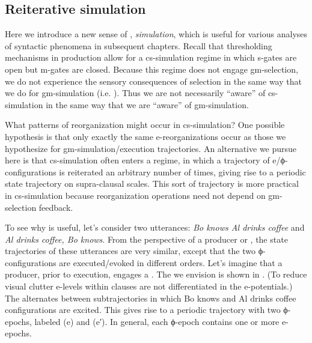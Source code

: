 \subsection{Reiterative simulation}

Here we introduce a new sense of , \textit{ simulation}, which is useful for various analyses of syntactic phenomena in subsequent chapters. Recall that thresholding mechanisms in production allow for a cs-simulation regime in which s-gates are open but m-gates are closed. Because this regime does not engage gm-selection, we do not experience the sensory consequences of selection in the same way that we do for gm-simulation (i.e. ). Thus we are not necessarily “aware” of cs-simulation in the same way that we are “aware” of gm-simulation.

  What patterns of reorganization might occur in cs-simulation? One possible hypothesis is that only exactly the same e-reorganizations occur as those we hypothesize for gm-simulation/execution trajectories. An alternative we pursue here is that cs-simulation often enters a  regime, in which a trajectory of e/ϕ-con\-fig\-u\-ra\-tions is reiterated an arbitrary number of times, giving rise to a periodic state trajectory on supra-clausal scales. This sort of trajectory is more practical in cs-simulation because reorganization operations need not depend on gm-selection feedback.

  To see why  is useful, let's consider two utterances: \textit{Bo knows Al drinks coffee} and \textit{Al drinks coffee, Bo knows}. From the perspective of a producer or , the state trajectories of these utterances are very similar, except that the two ϕ-con\-fig\-u\-ra\-tions are executed/evoked in different orders. Let's imagine that a producer, prior to execution, engages a . The  we envision is shown in {}. (To reduce visual clutter e-levels within clauses are not differentiated in the e-potentials.) The  alternates between subtrajectories in which {\textbar}Bo knows{\textbar} and {\textbar}Al drinks coffee{\textbar} configurations are excited. This gives rise to a periodic trajectory with two ϕ-epochs,  labeled (e) and (e′). In general, each ϕ-epoch contains one or more e-epochs.


